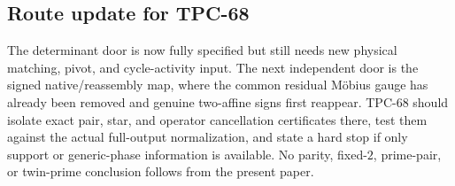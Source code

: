 \subsection{Route update for TPC-68}
The determinant door is now fully specified but still needs new physical
matching, pivot, and cycle-activity input. The next independent door is the
signed native/reassembly map, where the common residual M\"obius gauge has
already been removed and genuine two-affine signs first reappear. TPC-68
should isolate exact pair, star, and operator cancellation certificates there,
test them against the actual full-output normalization, and state a hard stop
if only support or generic-phase information is available. No parity,
fixed-\(2\), prime-pair, or twin-prime conclusion follows from the present
paper.
